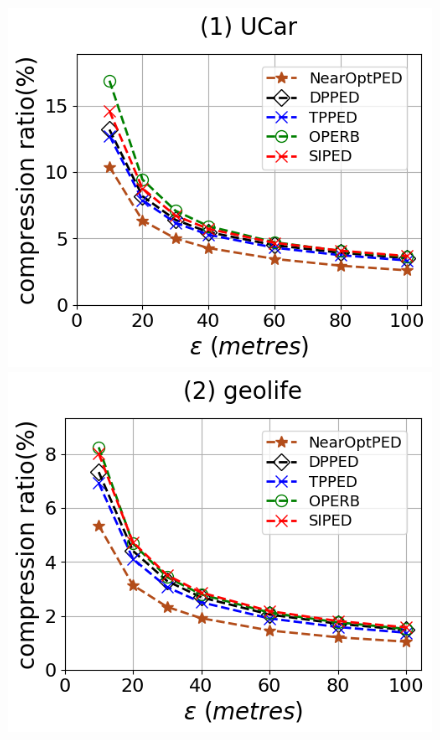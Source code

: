 \begin{figure}[tb!]
	\centering
	\includegraphics[scale=0.315]{Figures/Exp-PED-CR-epsilon-service.png} 	\hspace{1ex}
	\includegraphics[scale=0.315]{Figures/Exp-PED-CR-epsilon-geolife.png}	\hspace{1ex}

\end{figure}
